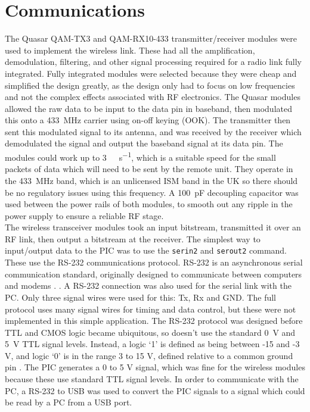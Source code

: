 \section{Communications}

The Quasar QAM-TX3 \cite{qam-tx} and QAM-RX10-433 \cite{qam-rx} transmitter/receiver modules were used to implement the wireless link. These had all the amplification, demodulation, filtering, and other signal processing required for a radio link fully integrated. Fully integrated modules were selected because they were cheap and simplified the design greatly, as the design only had to focus on low frequencies and not the complex effects associated with RF electronics. The Quasar modules allowed the raw data to be input to the data pin in baseband, then modulated this onto a \SI{433}{\mega\hertz} carrier using on-off keying (OOK). The transmitter then sent this modulated signal to its antenna, and was received by the receiver which demodulated the signal and output the baseband signal at its data pin. The modules could work up to \SI{3}{\kilo\bit\per\second}, which is a suitable speed for the small packets of data which will need to be sent by the remote unit. They operate in the \SI{433}{\mega\hertz} band, which is an unlicensed ISM band in the UK \cite{ism_band} so there should be no regulatory issues using this frequency. A \SI{100}{\pico\farad} decoupling capacitor was used between the power rails of both modules, to smooth out any ripple in the power supply to ensure a reliable RF stage.\\


The wireless transceiver modules took an input bitstream, transmitted it over an RF link, then output a bitstream at the receiver. The simplest way to input/output data to the PIC was to use the \verb|serin2| and \verb|serout2| command. These use the RS-232 communications protocol. RS-232 is an asynchronous serial communication standard, originally designed to communicate between computers and modems \cite{rs232}. . A RS-232 connection was also used for the serial link with the PC. Only three signal wires were used for this: Tx, Rx and GND. The full protocol uses many signal wires for timing and data control, but these were not implemented in this simple application. The RS-232 protocol was designed before TTL and CMOS logic became ubiquitous, so doesn't use the standard \SI{0}{\volt} and \SI{5}{\volt} TTL signal levels. Instead, a logic `1' is defined as being between -15 and -3 V, and logic `0' is in the range 3 to 15 V, defined relative to a common ground pin \cite{rs232}. The PIC generates a 0 to 5 V signal, which was fine for the wireless modules because these use standard TTL signal levels. In order to communicate with the PC, a RS-232 to USB was used to convert the PIC signals to a signal which could be read by a PC from a USB port.\\

